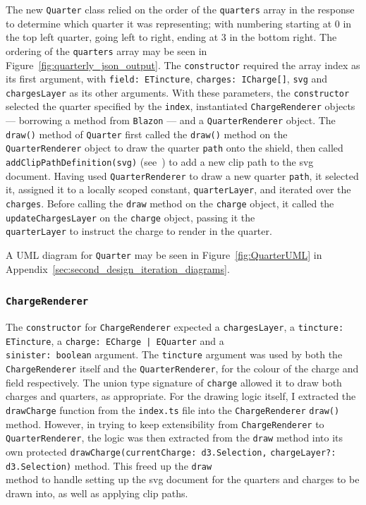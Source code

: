 \documentclass[nobib, a4paper, twoside, justified]{tufte-book}
\makeatletter
\newcommand{\svg}{\gls{svg}\@\xspace}
\newcommand{\charge}{\gls{charge}\@\xspace}
\newcommand{\charges}{\glspl{charge}\@\xspace}
\newcommand{\quarter}{\gls{quarter}\@\xspace}
\newcommand{\quarters}{\glspl{quarter}\@\xspace}
\makeatother
\begin{document}
The new \texttt{Quarter} class relied on the order of the \texttt{quarters} array in the response
to determine which quarter it was representing; with numbering starting at 0 in the top left
quarter, going left to right, ending at 3 in the bottom right. The ordering of the
\texttt{quarters} array may be seen in Figure~\ref{fig:quarterly_json_output}. The
\texttt{constructor} required the array index as its first argument, with \texttt{field:
ETincture}, \texttt{charges: ICharge[]}, \texttt{svg} and \texttt{chargesLayer} as its other
arguments. With these parameters, the \texttt{constructor} selected the quarter specified by the
\texttt{index}, instantiated \texttt{ChargeRenderer} objects --- borrowing a method from
\texttt{Blazon} --- and a \texttt{QuarterRenderer} object. The \texttt{draw()} method of
\texttt{Quarter} first called the \texttt{draw()} method on the \texttt{QuarterRenderer} object to
draw the quarter \texttt{path} onto the shield, then called \\ \texttt{addClipPathDefinition(svg)}
(see~) to add a new clip path to the \svg document. Having used
\texttt{QuarterRenderer} to draw a new quarter \texttt{path}, it selected it, assigned it to a
locally scoped constant, \texttt{quarterLayer}, and iterated over the \texttt{charges}. Before
calling the \texttt{draw} method on the \texttt{charge} object, it called the \\
\texttt{updateChargesLayer} on the \texttt{charge} object, passing it the \\ \texttt{quarterLayer}
to instruct the \charge to render in the \quarter.

A UML diagram for \texttt{Quarter} may be seen in Figure~\ref{fig:QuarterUML} in
Appendix~\ref{sec:second_design_iteration_diagrams}.

\subsubsection{\texttt{ChargeRenderer}}%
\label{ssub:charge_renderer}

The \texttt{constructor} for \texttt{ChargeRenderer} expected a \texttt{chargesLayer}, a
\texttt{tincture: ETincture}, a \texttt{charge: ECharge | EQuarter} and a \\ \texttt{sinister:
boolean} argument. The \texttt{tincture} argument was used by both the \texttt{ChargeRenderer}
itself and the \texttt{QuarterRenderer}, for the colour of the \charge and \gls{field}
respectively. The union type signature of \texttt{charge} allowed it to draw both \charges and
\quarters, as appropriate. For the drawing logic itself, I extracted the \texttt{drawCharge}
function from the \texttt{index.ts} file into the \texttt{ChargeRenderer} \texttt{draw()} method.
However, in trying to keep extensibility from \texttt{ChargeRenderer} to \texttt{QuarterRenderer},
the logic was then extracted from the \texttt{draw} method into its own protected
\texttt{drawCharge(}\texttt{currentCharge: d3.Selection,} \texttt{chargeLayer?: d3.Selection)}
method. This freed up the \texttt{draw} \\ method to handle setting up the \svg document for the
\quarters and \charges to be drawn into, as well as applying clip paths.
\end{document}
